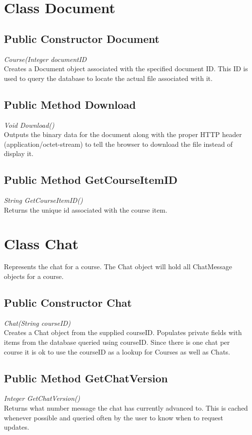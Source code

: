 \documentclass{scrreprt}
\begin{document}
\section{Class Document}

\subsection{Public Constructor Document}
\textit{Course(Integer documentID} \\
Creates a Document object associated with the specified document ID. This ID is used to query the database to locate the actual file associated with it.

\subsection{Public Method Download}
\textit{Void Download()} \\
Outputs the binary data for the document along with the proper HTTP header (application/octet-stream) to tell the browser to download the file instead of display it.

\subsection{Public Method GetCourseItemID}
\textit{String GetCourseItemID()} \\
Returns the unique id associated with the course item.

\section{Class Chat}
Represents the chat for a course. The Chat object will hold all ChatMessage objects for a course.

\subsection{Public Constructor Chat}
\textit{Chat(String courseID)} \\
Creates a Chat object from the supplied courseID. Populates private fields with items from the database queried using courseID. Since there is one chat per course it is ok to use the courseID as a lookup for Courses as well as Chats.

\subsection{Public Method GetChatVersion}
\textit{Integer GetChatVersion()} \\
Returns what number message the chat has currently advanced to. This is cached whenever possible and queried often by the user to know when to request updates.
\end{document}
